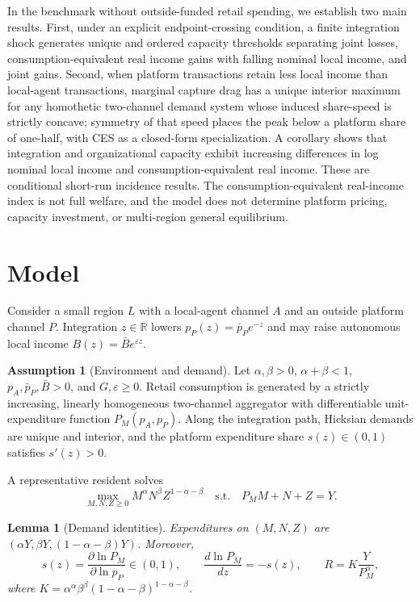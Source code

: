 \documentclass[11pt]{article}
\theoremstyle{plain}
\newtheorem{lemma}{Lemma}
\theoremstyle{definition}
\newtheorem{assumption}{Assumption}
\begin{document}
In the benchmark without outside-funded retail spending, we establish two main
results. First, under an explicit endpoint-crossing condition, a finite
integration shock generates unique and ordered capacity thresholds separating
joint losses, consumption-equivalent real income gains with falling nominal local
income, and joint gains. Second, when platform transactions retain less local
income than local-agent transactions, marginal capture drag has a unique
interior maximum for any homothetic two-channel demand system whose induced
share-speed is strictly concave;
symmetry of that speed places the peak below a platform share of one-half, with
CES as a closed-form specialization. A corollary shows that integration and
organizational capacity exhibit increasing differences in log nominal local
income and consumption-equivalent real income. These are conditional short-run
incidence results. The consumption-equivalent real-income index is not full
welfare, and the model does not determine platform pricing, capacity investment,
or multi-region general equilibrium.

\section{Model}
\label{sec:model}

Consider a small region \(L\) with a local-agent channel \(A\) and an outside
platform channel \(P\). Integration \(z\in\mathbb R\) lowers
\(p_P(z)=\bar p_Pe^{-z}\) and may raise autonomous local income
\(B(z)=\bar Be^{\varepsilon z}\).

\begin{assumption}[Environment and demand]
\label{ass:primitives}
Let \(\alpha,\beta>0\), \(\alpha+\beta<1\),
\(p_A,\bar p_P,\bar B>0\), and \(G,\varepsilon\geq0\). Retail consumption is
generated by a strictly increasing, linearly homogeneous two-channel
aggregator with differentiable unit-expenditure function \(P_M(p_A,p_P)\).
Along the integration path, Hicksian demands are unique and interior, and the
platform expenditure share \(s(z)\in(0,1)\) satisfies \(s'(z)>0\).
\end{assumption}

A representative resident solves
\begin{equation}
 \max_{M,N,Z\geq0}M^\alpha N^\beta Z^{1-\alpha-\beta}
 \quad\text{s.t.}\quad P_MM+N+Z=Y.
 \label{eq:outer-problem}
\end{equation}

\begin{lemma}[Demand identities]
\label{lem:demand}
Expenditures on \((M,N,Z)\) are
\((\alpha Y,\beta Y,(1-\alpha-\beta)Y)\). Moreover,
\begin{equation}
 s(z)=\frac{\partial\ln P_M}{\partial\ln p_P}\in(0,1),
 \qquad \frac{d\ln P_M}{dz}=-s(z),
 \qquad R=K\frac{Y}{P_M^\alpha},
 \label{eq:demand-identities}
\end{equation}
where
\(K=\alpha^\alpha\beta^\beta
(1-\alpha-\beta)^{1-\alpha-\beta}\).
\end{lemma}
\end{document}
